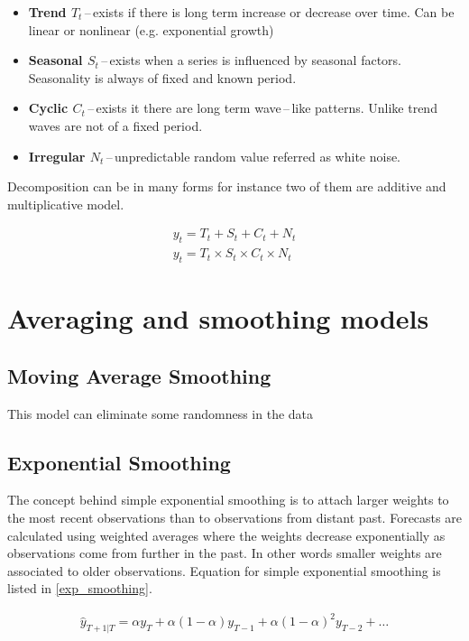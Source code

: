 \begin{itemize}
    \item \textbf{Trend $ T_{t} $}\,--\,exists if there is long term increase or decrease over
        time. Can be linear or nonlinear (e.g. exponential growth)
    \item \textbf{Seasonal $ S_{t} $}\,--\,exists when a series is influenced by seasonal factors.
        Seasonality is always of fixed and known period.
    \item \textbf{Cyclic $ C_{t} $}\,--\,exists it there are long term wave\,--\,like patterns.
        Unlike trend waves are not of a fixed period.
    \item \textbf{Irregular $ N_{t} $}\,--\,unpredictable random value referred as white
        noise. 
\end{itemize}

Decomposition can be in many forms for instance two of them are additive and multiplicative model.

\begin{eqnarray}
    y_{t} = T_{t} + S_{t} + C_{t} + N_{t} \\
    y_{t} = T_{t} \times S_{t} \times C_{t} \times N_{t} 
\end{eqnarray}

\section{Averaging and smoothing models}
\subsection{Moving Average Smoothing}
This model can eliminate some randomness in the data 

\subsection{Exponential Smoothing}
The concept behind simple exponential smoothing is to attach 
larger weights to the most recent observations than to observations from distant
past. Forecasts are calculated using weighted averages where the weights 
decrease exponentially as observations come from further in the past.
In other words smaller weights are associated to older observations.
Equation for simple exponential smoothing is listed in \ref{exp_smoothing}.

\begin{eqnarray} \label{exp_smoothing}
 \hat{y}_{T+1|T} = \alpha y_{T} + \alpha(1-\alpha)y_{T-1} +
    \alpha(1-\alpha)^2 y_{T-2} +\dots 
\end{eqnarray}

